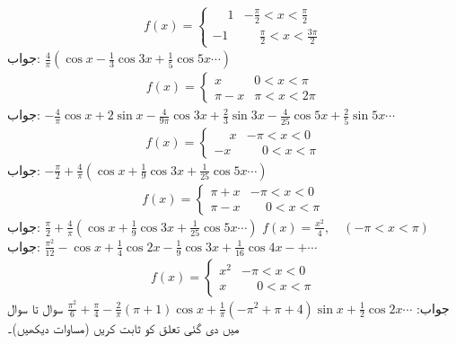 \begin{align*}
f(x)=
\begin{cases}
\phantom{-}1&-\frac{\pi}{2}<x<\frac{\pi}{2}\\
-1&\phantom{-} \frac{\pi}{2}<x<\frac{3\pi}{2}
\end{cases}
\end{align*}
جواب:\quad
$\tfrac{4}{\pi}(\cos x-\tfrac{1}{3}\cos 3x+\tfrac{1}{5}\cos 5x\cdots)$
\begin{align*}
f(x)=
\begin{cases}
x&0<x<\pi\\
\pi-x&\pi<x<2\pi
\end{cases}
\end{align*}
جواب:\quad
$-\tfrac{4}{\pi}\cos x+2\sin x-\tfrac{4}{9\pi}\cos 3x+\tfrac{2}{3}\sin 3x-\tfrac{4}{25}\cos 5x+\tfrac{2}{5}\sin 5x\cdots$
\begin{align*}
f(x)=
\begin{cases}
\phantom{-}x&-\pi<x<0\\
-x&\phantom{-}0<x<\pi
\end{cases}
\end{align*}
جواب:\quad
$-\tfrac{\pi}{2}+\tfrac{4}{\pi}(\cos x+\tfrac{1}{9}\cos 3x+\tfrac{1}{25}\cos 5x\cdots)$
\begin{align*}
f(x)=
\begin{cases}
\pi+x&-\pi<x<0\\
\pi-x&\phantom{-}0<x<\pi
\end{cases}
\end{align*}
جواب:\quad
$\tfrac{\pi}{2}+\tfrac{4}{\pi}(\cos x+\tfrac{1}{9}\cos 3x+\tfrac{1}{25}\cos 5x\cdots)$
\quad
$f(x)=\frac{x^2}{4},\quad (-\pi<x<\pi)$\\
جواب:\quad
$\tfrac{\pi^2}{12}-\cos x+\tfrac{1}{4}\cos 2x-\tfrac{1}{9}\cos 3x+\tfrac{1}{16}\cos 4x-+\cdots$
\begin{align*}
f(x)=
\begin{cases}
x^2&-\pi<x<0\\
x&\phantom{-}0<x<\pi
\end{cases}
\end{align*}
جواب:\quad
$\tfrac{\pi^2}{6}+\tfrac{\pi}{4}-\tfrac{2}{\pi}(\pi+1)\cos x+\tfrac{1}{\pi}(-\pi^2+\pi+4)\sin x+\tfrac{1}{2}\cos 2x\cdots$
سوال  تا سوال  میں دی گئی تعلق کو ثابت کریں (مساوات  دیکھیں)۔

